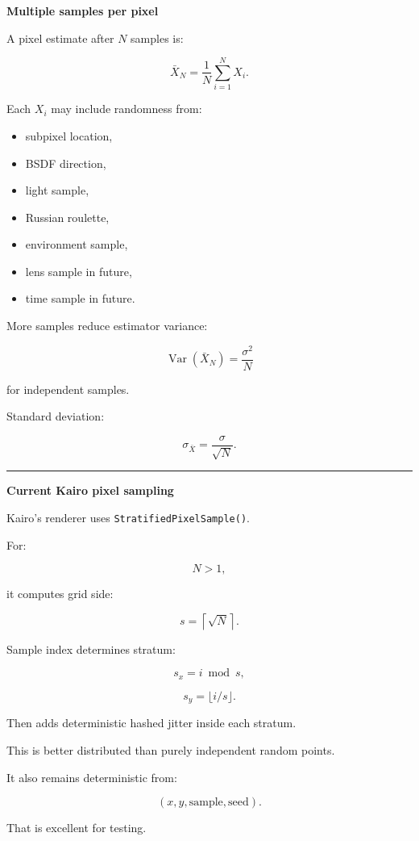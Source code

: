 \textbf{Multiple samples per pixel}

A pixel estimate after \(N\) samples is:

\[
\boxed{
\bar X_N
=
\frac1N
\sum_{i=1}^NX_i.
}
\]

Each \(X_i\) may include randomness from:

\begin{itemize}
\tightlist
\item
  subpixel location,
\item
  BSDF direction,
\item
  light sample,
\item
  Russian roulette,
\item
  environment sample,
\item
  lens sample in future,
\item
  time sample in future.
\end{itemize}

More samples reduce estimator variance:

\[
\operatorname{Var}(\bar X_N)
=
\frac{\sigma^2}{N}
\]

for independent samples.

Standard deviation:

\[
\boxed{
\sigma_{\bar X}
=
\frac{\sigma}{\sqrt N}.
}
\]

\begin{center}\rule{0.5\linewidth}{0.5pt}\end{center}

\textbf{Current Kairo pixel sampling}

Kairo's renderer uses \texttt{StratifiedPixelSample()}.

For:

\[
N>1,
\]

it computes grid side:

\[
s=
\left\lceil
\sqrt N
\right\rceil.
\]

Sample index determines stratum:

\[
s_x=i\bmod s,
\]

\[
s_y=\lfloor i/s\rfloor.
\]

Then adds deterministic hashed jitter inside each stratum.

This is better distributed than purely independent random points.

It also remains deterministic from:

\[
(x,y,\text{sample},\text{seed}).
\]

That is excellent for testing.

